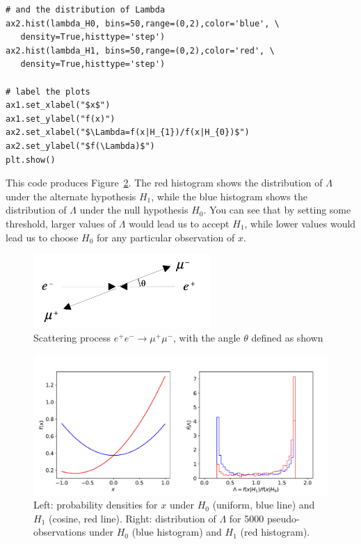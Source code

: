 \begin{tcolorbox}[colback=backblue]
\begin{lstlisting}[style = Python]
# and the distribution of Lambda
ax2.hist(lambda_H0, bins=50,range=(0,2),color='blue', \ 
   density=True,histtype='step')
ax2.hist(lambda_H1, bins=50,range=(0,2),color='red', \
   density=True,histtype='step')

# label the plots
ax1.set_xlabel("$x$")
ax1.set_ylabel("f(x)")
ax2.set_xlabel("$\Lambda=f(x|H_{1})/f(x|H_{0})$")
ax2.set_ylabel("$f(\Lambda)$")
plt.show()
\end{lstlisting}
This code produces Figure~\ref{fig:lhclassification}. The red histogram shows the distribution of $\Lambda$ under the alternate hypothesis $H_1$, while the blue histogram shows the distribution of $\Lambda$ under the null  hypothesis $H_0$. You can see that by setting some threshold, larger values of $\Lambda$ would lead us to accept $H_1$, while lower values would lead us to choose $H_0$ for any particular observation of $x$.
\end{tcolorbox}
 \begin{figure}
    \centering
    \includegraphics[width=0.6\textwidth]{figures/Hypotest/scatter.png}
    \caption{Scattering process $e^{+}e^{-}\rightarrow \mu^{+}\mu^{-}$, with the angle $\theta$ defined as shown}
    \label{fig:eemm}
\end{figure}
 \begin{figure}
     \centering
     \includegraphics[width=\textwidth]{figures/Hypotest/densities.pdf}
     \caption{Left: probability densities for $x$ under $H_0$ (uniform, blue line) and $H_1$ (cosine, red line). Right: distribution of $\Lambda$ for 5000 pseudo-observations under $H_0$ (blue histogram) and $H_1$ (red histogram).}
     \label{fig:lhclassification}
 \end{figure}
